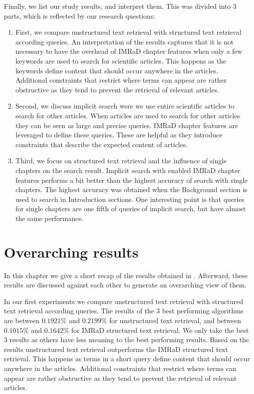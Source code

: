 Finally, we list our study results, and interpret them. This was divided into $3$ parts, which is reflected by our research questions:
\begin{enumerate}[label=(\alph*)]
  \item First, we compare unstructured text retrieval with structured text retrieval according queries. An interpretation of the results captures that it is not necessary to have the overhead of IMRaD chapter features when only a few keywords are used to search for scientific articles. This happens as the keywords define content that should occur anywhere in the articles. Additional constraints that restrict where terms can appear are rather obstructive as they tend to prevent the retrieval of relevant articles.
  \item Second, we discuss implicit search were we use entire scientific articles to search for other articles. When articles are used to search for other articles they can be seen as large and precise queries. IMRaD chapter features are leveraged to define these queries. These are helpful as they introduce constraints that describe the expected content of articles.
  \item Third, we focus on structured text retrieval and the influence of single chapters on the search result. Implicit search with enabled IMRaD chapter features performs a bit better than the highest accuracy of search with single chapters. The highest accuracy was obtained when the Background section is used to search in Introduction sections. One interesting point is that queries for single chapters are one fifth of queries of implicit search, but have almost the same performance.
\end{enumerate}

\section{Overarching results}
\label{sec:overarching_results}

In this chapter we give a short recap of the results obtained in . Afterward, these results are discussed against each other to generate an overarching view of them.

In our first experiments we compare unstructured text retrieval with structured text retrieval according queries. The results of the $3$ best performing algorithms are between $0.1921\%$ and $0.2199\%$ for unstructured text retrieval, and between $0.1015\%$ and $0.1642\%$ for IMRaD structured text retrieval. We only take the best $3$ results as others have less meaning to the best performing results. Based on the results unstructured text retrieval outperforms the IMRaD structured text retrieval. This happens as terms in a short query define content that should occur anywhere in the articles. Additional constraints that restrict where terms can appear are rather obstructive as they tend to prevent the retrieval of relevant articles.



